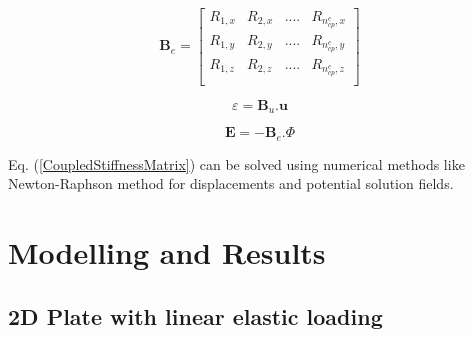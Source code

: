 \documentclass[11pt]{article}
\begin{document}
\begin{equation} \label{BeMatrix}
\textbf{B}_e =
\begin{bmatrix}
R_{1,x} & R_{2,x} & .... & R_{n_{cp}^e,x} \\
R_{1,y} & R_{2,y} & .... & R_{n_{cp}^e,y} \\
R_{1,z} & R_{2,z} & .... & R_{n_{cp}^e,z} \\
\end{bmatrix}
\end{equation}

\begin{equation}
\varepsilon = \textbf{B}_u . \textbf{u}
\end{equation}

\begin{equation}
\textbf{E} = - \textbf{B}_e . \Phi
\end{equation}

\noindent
Eq. (\ref{CoupledStiffnessMatrix}) can be solved using numerical methods like
Newton-Raphson method for displacements and potential solution fields.

\newpage
\section{Modelling and Results}
\subsection{2D Plate with linear elastic loading} 
\end{document}
